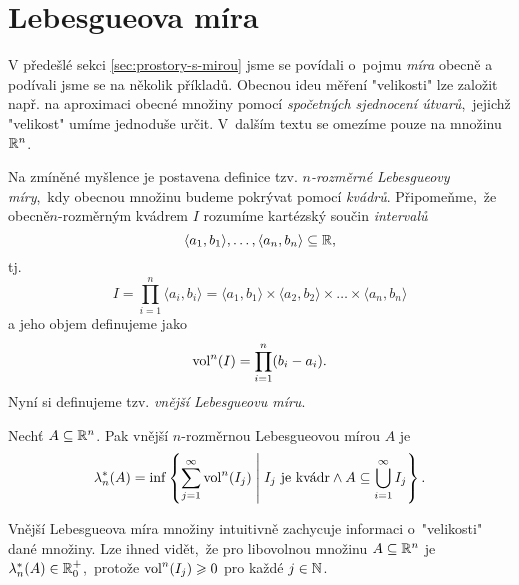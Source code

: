 \section{Lebesgueova míra}\label{sec:lebesgueova-mira}


V předešlé sekci \ref{sec:prostory-s-mirou} jsme se povídali o~pojmu \emph{míra} obecně a podívali jsme se na několik příkladů. Obecnou ideu měření "velikosti" lze založit např. na aproximaci obecné množiny pomocí \emph{spočetných sjednocení útvarů},~jejichž "velikost" umíme jednoduše určit. V~dalším textu se omezíme pouze na množinu $\mathbb{R}^n$.

Na zmíněné myšlence je postavena definice tzv. \emph{$n$-rozměrné Lebesgueovy míry},~kdy obecnou množinu budeme pokrývat pomocí \emph{kvádrů}. Připomeňme,~že obecně\linebreak\mbox{$n$-rozměrným} kvádrem $I$ rozumíme kartézský součin \emph{intervalů}
\[\langle a_1,b_1\rangle,\ldots,\langle a_n,b_n\rangle\subseteq\mathbb{R},\]
tj.
\[I=\prod_{i=1}^{n}\langle a_i,b_i\rangle=\langle a_1,b_1\rangle\times\langle a_2,b_2\rangle\times\dots\times\langle a_n,b_n\rangle\]
a jeho objem definujeme jako
\[\operatorname{vol}^n(I)=\prod_{i=1}^{n}(b_i-a_i).\]
Nyní si definujeme tzv. \emph{vnější Lebesgueovu míru}.
\begin{definition}\label{def:vnejsi-lebegueova-mira}
    Nechť $A\subseteq\mathbb{R}^n$. Pak vnější $n$-rozměr\-nou Lebesgueovou mírou $A$ je
    \[\lambda_n^*(A)=\inf\left\{\sum_{j=1}^{\infty}\operatorname{vol}^n(I_j)\;\middle|\;\text{$I_j$ je kvádr}\land A\subseteq\bigcup_{i=1}^\infty I_j\right\}.\]
\end{definition}
Vnější Lebesgueova míra množiny intuitivně zachycuje informaci o~"velikosti" dané množiny.  Lze ihned vidět,~že pro libovolnou množinu $A\subseteq\mathbb{R}^n$ je $\lambda_n^*(A)\in\mathbb{R}_0^+$,~protože $\operatorname{vol}^n(I_j)\geqslant0$ pro každé $j\in\mathbb{N}$.
